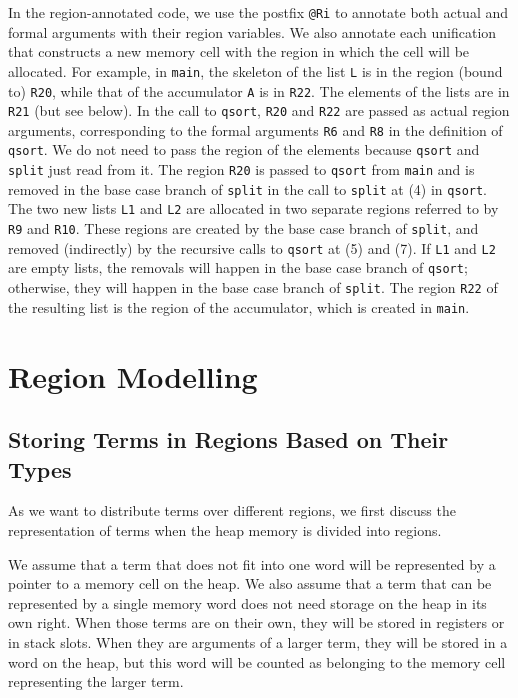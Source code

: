 \documentclass{tlp}
\newcommand{\code}[1]{{\tt#1}}
\begin{document}
In the region-annotated code,
we use the postfix \code{@Ri} to annotate both actual and formal arguments
with their region variables.
We also annotate each unification that constructs a new memory cell
with the region in which the cell will be allocated.
For example, in \code{main}, the skeleton of the list \code{L}
is in the region (bound to) \code{R20},
while that of the accumulator \code{A} is in \code{R22}.
The elements of the lists are in \code{R21} (but see below).
In the call to \code{qsort},
\code{R20} and \code{R22} are passed as actual region arguments,
corresponding to the formal arguments \code{R6} and \code{R8}
in the definition of \code{qsort}.
We do not need to pass the region of the elements because
\code{qsort} and \code{split} just read from it.
The region \code{R20} is passed to \code{qsort} from \code{main} and
is removed in the base case branch of \code{split}
in the call to \code{split} at (4) in \code{qsort}.
The two new lists \code{L1} and
\code{L2} are allocated in two separate regions referred to by \code{R9}
and \code{R10}.
These regions are created by the base case branch of \code{split},
and removed (indirectly) by the recursive calls to \code{qsort} at (5) and (7).
If \code{L1} and \code{L2} are empty lists,
the removals will happen in the base case branch of \code{qsort};
otherwise, they will happen in the base case branch of \code{split}.
The region \code{R22} of the resulting list is the region of the accumulator,
which is created in \code{main}.

\section{Region Modelling}
\label{seCregionCmodel}

\subsection{Storing Terms in Regions Based on Their Types}

As we want to distribute terms over different regions,
we first discuss the representation of terms
when the heap memory is divided into regions.

We assume that a term that does not fit into one word
will be represented by a pointer to a memory cell on the heap.
We also assume that a term that can be represented by a single memory word
does not need storage on the heap in its own right.
When those terms are on their own,
they will be stored in registers or in stack slots.
When they are arguments of a larger term,
they will be stored in a word on the heap,
but this word will be counted as
belonging to the memory cell representing the larger term.
\end{document}
